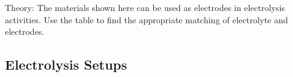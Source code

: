 \begin{multicols}{2}
\begin{description*}
\item[Theory:]{The materials shown here can be used as electrodes in electrolysis activities. Use the table to find the appropriate matching of electrolyte and electrodes.}
\end{description*}

%
%

\subsection{Electrolysis Setups} 


\end{multicols}
